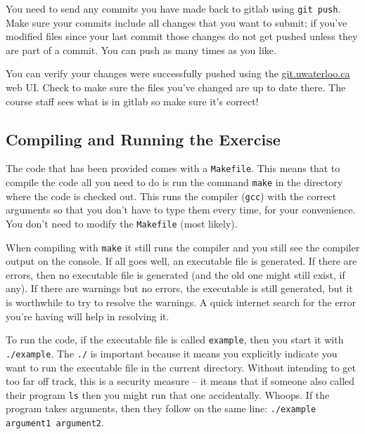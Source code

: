 You need to send any commits you have made back to gitlab using \texttt{git push}. Make sure your commits include all changes that you want to submit; if you've modified files since your last commit those changes do not get pushed unless they are part of a commit. You can push as many times as you like.

You can verify your changes were successfully pushed using the \url{git.uwaterloo.ca} web UI. Check to make sure the files you've changed are up to date there. The course staff sees what is in gitlab so make sure it's correct!

\subsection*{Compiling and Running the Exercise}

The code that has been provided comes with a \texttt{Makefile}. This means that to compile the code all you need to do is run the command \texttt{make} in the directory where the code is checked out. This runs the compiler (\texttt{gcc}) with the correct arguments so that you don't have to type them every time, for your convenience. You don't need to modify the \texttt{Makefile} (most likely).

When compiling with \texttt{make} it still runs the compiler and you still see the compiler output on the console. If all goes well, an executable file is generated. If there are errors, then no executable file is generated (and the old one might still exist, if any). If there are warnings but no errors, the executable is still generated, but it is worthwhile to try to resolve the warnings. A quick internet search for the error you're having will help in resolving it.

To run the code, if the executable file is called \texttt{example}, then you start it with \texttt{./example}. The \texttt{./} is important because it means you explicitly indicate you want to run the executable file in the current directory. Without intending to get too far off track, this is a security measure -- it means that if someone also called their program  \texttt{ls} then you might run that one accidentally. Whoops. If the program takes arguments, then they follow on the same line: \texttt{./example argument1 argument2}.




